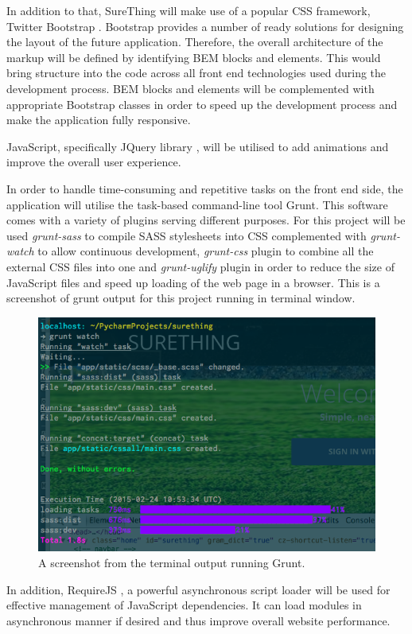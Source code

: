 In addition to that, SureThing will make use of a popular CSS framework, Twitter Bootstrap \citep{documentation:Bootstrap3}. Bootstrap provides a number of ready solutions for designing the layout of the future application. Therefore, the overall architecture of the markup will be defined by identifying BEM blocks and elements. This would bring structure into the code across all front end technologies used during the development process. BEM blocks and elements will be complemented with appropriate Bootstrap classes in order to speed up the development process and make the application fully responsive.
 
JavaScript, specifically JQuery library \citep{documentation:jQuery}, will be utilised to add animations and improve the overall user experience.  

In order to handle time-consuming and repetitive tasks on the front end side, the application will utilise the task-based command-line tool Grunt. This software comes with a variety of plugins serving different purposes. For this project will be used \emph{grunt-sass} to compile SASS stylesheets into CSS complemented with \emph{grunt-watch} to allow continuous development, \emph{grunt-css} plugin to combine all the external CSS files into one and \emph{grunt-uglify} plugin in order to reduce the size of JavaScript files and speed up loading of the web page in a browser. This is a screenshot of grunt output for this project running in terminal window.

\begin{figure}[H]
	\begin{center}
		\includegraphics[width=.60\textwidth]{impl/images/gruntInAction}
		\caption{A screenshot from the terminal output running Grunt.} \label{fig:using:gruntinaction}
	\end{center}
\end{figure}
	
In addition, RequireJS  \citep{documentation:RequireJS}, a powerful asynchronous script loader will be used for effective management of JavaScript dependencies. It can load modules in asynchronous manner if desired and thus improve overall website performance.

